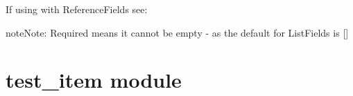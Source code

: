 \documentclass[letterpaper,10pt,english]{sphinxmanual}
\begin{document}
\begin{fulllineitems}
\begin{fulllineitems}
If using with ReferenceFields see: 

\begin{sphinxadmonition}{note}{Note:}
Required means it cannot be empty - as the default for ListFields is {[}{]}
\end{sphinxadmonition}

\end{fulllineitems}


\end{fulllineitems}



\chapter{test\_item module}
\label{\detokenize{test_item:test-item-module}}\label{\detokenize{test_item::doc}}\label{\detokenize{test_item:module-test_item}}
\end{document}
